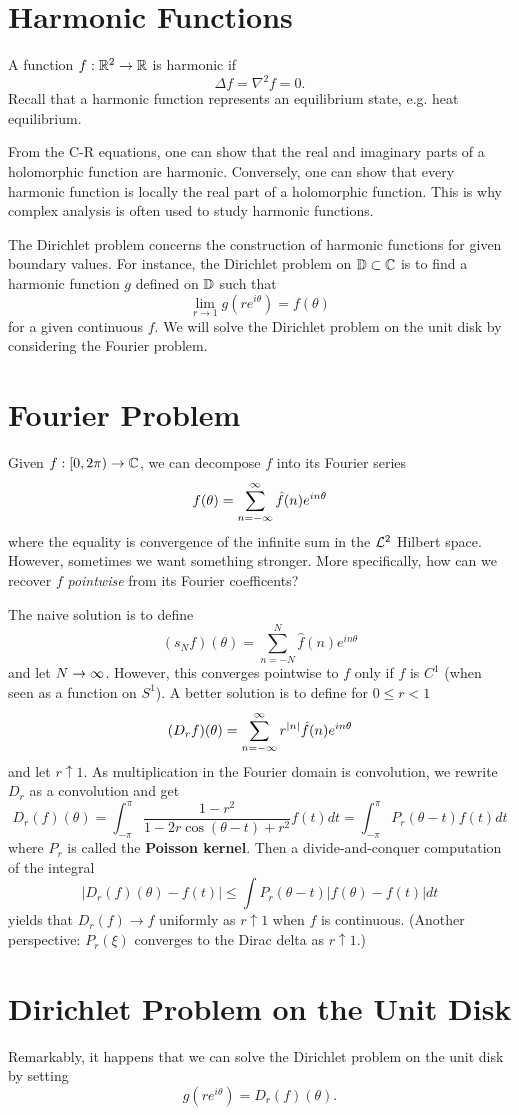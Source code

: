 \section{Harmonic Functions}
A function $f: {\mathbb R}^2 \to {\mathbb R}$ is harmonic if
\[
    \Delta f = \nabla^2 f = 0.
\]
Recall that a harmonic function represents an equilibrium state, e.g. heat equilibrium.

From the C-R equations, one can show that the real and imaginary parts of a holomorphic function are harmonic. Conversely, one can show that every harmonic function is locally the real part of a holomorphic function. This is why complex analysis is often used to study harmonic functions.

The Dirichlet problem concerns the construction of harmonic functions for given boundary values. For instance, the Dirichlet problem on ${\mathbb D} \subset {\mathbb C}$ is to find a harmonic function $g$ defined on ${\mathbb D}$ such that
\[
    \lim_{r \to 1} g(re^{i\theta}) = f(\theta)
\]
for a given continuous $f$. We will solve the Dirichlet problem on the unit disk by considering the Fourier problem.

\section{Fourier Problem}

Given $f: [0, 2\pi) \to {\mathbb C}$, we can decompose $f$ into its Fourier series
\[
    f(\theta) = \sum_{n = -\infty}^\infty \hat{f}(n)e^{in\theta}
\]
where the equality is convergence of the infinite sum in the ${\mathcal L}^2$ Hilbert space. However, sometimes we want something stronger. More specifically, how can we recover $f$ \textit{pointwise} from its Fourier coefficents?

The naive solution is to define
\[
    (s_Nf)(\theta) = \sum_{n = -N}^N \hat{f}(n)e^{in\theta}
\]
and let $N \to \infty$. However, this converges pointwise to $f$ only if $f$ is $C^1$ (when seen as a function on $S^1$). A better solution is to define for $0 \le r < 1$
\[
    (D_rf)(\theta) = \sum_{n = -\infty}^\infty r^{|n|}\hat{f}(n)e^{in\theta}
\]
and let $r \uparrow 1$. As multiplication in the Fourier domain is convolution, we rewrite $D_r$ as a convolution and get
\[
    D_r(f)(\theta) = \int_{-\pi}^\pi \frac{1 -r^2}{1 - 2r\cos(\theta-t) + r^2}f(t)dt = \int_{-\pi}^\pi P_r(\theta-t)f(t)dt
\]
where $P_r$ is called the \textbf{Poisson kernel}. Then a divide-and-conquer computation of the integral
\[
    |D_r(f)(\theta) - f(t)| \le \int P_r(\theta - t)|f(\theta)-f(t)|dt
\]
yields that $D_r(f) \to f$ uniformly as $r \uparrow 1$ when $f$ is continuous. (Another perspective: $P_r(\xi)$ converges to the Dirac delta as $r \uparrow 1$.)

\section{Dirichlet Problem on the Unit Disk}
Remarkably, it happens that we can solve the Dirichlet problem on the unit disk by setting
\[
    g(re^{i\theta}) = D_r(f)(\theta).
\]

